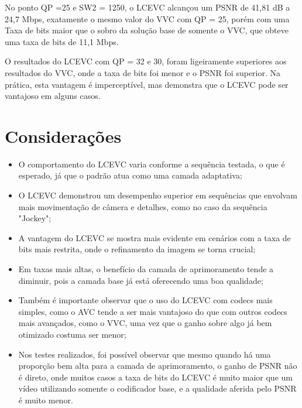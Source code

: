 No ponto QP =25 e SW2 = 1250, o \acrshort{LCEVC} alcançou um \acrshort{PSNR} de 41,81 dB
a 24,7 Mbps, exatamente o mesmo valor do \acrshort{VVC} com QP = 25, porém com uma Taxa
de bits maior que o sobro da solução base de somente o \acrshort{VVC}, que
obteve uma taxa de bits de 11,1 Mbps.

O resultados do \acrshort{LCEVC} com QP = 32 e 30, foram ligeiramente superiores
aos resultados do \acrshort{VVC}, onde a taxa de bits foi menor e o \acrshort{PSNR} foi
superior. Na prática, esta vantagem é imperceptível, mas demonstra que o \acrshort{LCEVC}
pode ser vantajoso em alguns casos.

\newpage

\section{Considerações}

\begin{itemize}
    \item O comportamento do \acrshort{LCEVC} varia conforme a sequência testada, o
    que é esperado, já que o padrão atua como uma camada adaptativa;

    \item O \acrshort{LCEVC} demonstrou um desempenho superior em sequências que
    envolvam mais movimentação de câmera e detalhes, como no caso da sequência "Jockey";
    
    \item A vantagem do \acrshort{LCEVC}  se mostra mais evidente em cenários com
    a taxa de bits mais restrita, onde o refinamento da imagem se torna crucial;

    \item Em taxas mais altas, o benefício da camada de aprimoramento tende a diminuir,
    pois a camada base já está oferecendo uma boa qualidade;

    \item Também é importante observar que o uso do \acrshort{LCEVC} com codecs mais
    simples, como o \acrshort{AVC} tende a ser mais vantajoso do que com outros codecs
    mais avançados, como o \acrshort{VVC}, uma vez que o ganho sobre algo já bem
    otimizado costuma ser menor;

    \item Nos testes realizados, foi possível observar que mesmo quando há uma proporção
    bem alta para a camada de aprimoramento, o ganho de \acrshort{PSNR} não é direto, onde
    muitos casos a taxa de bits do \acrshort{LCEVC} é muito maior que um vídeo utilizando
    somente o codificador base, e a qualidade aferida pelo \acrshort{PSNR} é muito menor.
\end{itemize}

